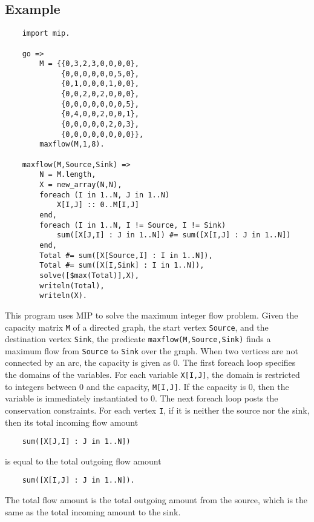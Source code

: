 \subsection*{Example}
\begin{verbatim}
    import mip.

    go =>
        M = {{0,3,2,3,0,0,0,0},
             {0,0,0,0,0,0,5,0},
             {0,1,0,0,0,1,0,0},
             {0,0,2,0,2,0,0,0},
             {0,0,0,0,0,0,0,5},
             {0,4,0,0,2,0,0,1},
             {0,0,0,0,0,2,0,3},
             {0,0,0,0,0,0,0,0}},
        maxflow(M,1,8).

    maxflow(M,Source,Sink) =>
        N = M.length,
        X = new_array(N,N),
        foreach (I in 1..N, J in 1..N)
            X[I,J] :: 0..M[I,J]
        end,
        foreach (I in 1..N, I != Source, I != Sink)
            sum([X[J,I] : J in 1..N]) #= sum([X[I,J] : J in 1..N]) 
        end,
        Total #= sum([X[Source,I] : I in 1..N]),
        Total #= sum([X[I,Sink] : I in 1..N]),
        solve([$max(Total)],X),
        writeln(Total),
        writeln(X).
\end{verbatim}
This program uses MIP to solve the maximum integer flow problem. Given the capacity matrix \texttt{M} of a directed graph, the start vertex \texttt{Source}, and the destination vertex \texttt{Sink}, the predicate \texttt{maxflow(M,Source,Sink)} finds a maximum flow from \texttt{Source} to \texttt{Sink} over the graph. When two vertices are not connected by an arc, the capacity is given as 0. The first foreach loop specifies the domains of the variables. For each variable \texttt{X[I,J]}, the domain is restricted to integers between 0 and the capacity, \texttt{M[I,J]}. If the capacity is 0, then the variable is immediately instantiated to 0. The next foreach loop posts the conservation constraints. For each vertex \texttt{I}, if it is neither the source nor the sink, then its total incoming flow amount 
\begin{verbatim}
    sum([X[J,I] : J in 1..N])
\end{verbatim}
is equal to the total outgoing flow amount 
\begin{verbatim}
    sum([X[I,J] : J in 1..N]).
\end{verbatim}
The total flow amount is the total outgoing amount from the source, which is the same as the total incoming amount to the sink.

